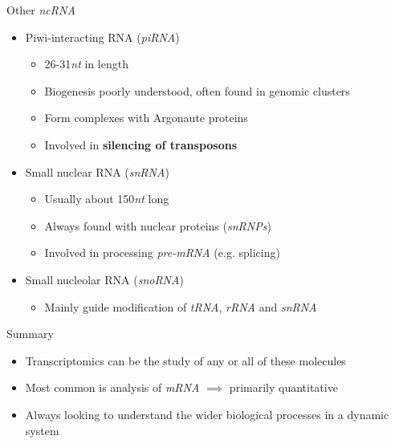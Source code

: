 \documentclass[aspectratio=169,11pt]{beamer}
\begin{document}
\begin{frame}{Other \textit{ncRNA}}

	\begin{itemize}
	
		\item Piwi-interacting RNA (\textit{piRNA})
		\begin{itemize}
			\item 26-31\textit{nt} in length
			\item Biogenesis poorly understood, often found in genomic clusters
			\item Form complexes with Argonaute proteins
			\item Involved in \textbf{silencing of transposons}
		\end{itemize}
		
		\item Small nuclear RNA (\textit{snRNA})
		\begin{itemize}
			\item Usually about 150\textit{nt} long
			\item Always found with nuclear proteins (\textit{snRNPs})
			\item Involved in processing \textit{pre-mRNA} (e.g. splicing)
		\end{itemize}
		
				\item Small nucleolar RNA (\textit{snoRNA})
		\begin{itemize}
			\item Mainly guide modification of \textit{tRNA}, \textit{rRNA} and \textit{snRNA}
		\end{itemize}
		
	\end{itemize}
	
\end{frame}

\begin{frame}{Summary}

	\begin{itemize}
		\item Transcriptomics can be the study of any or all of these molecules
		\item Most common is analysis of \textit{mRNA} $\implies$ primarily quantitative
		\item Always looking to understand the wider biological processes in a dynamic system
	\end{itemize}

\end{frame}
\end{document}
